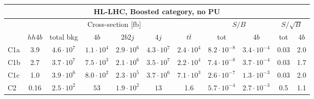 \begin{tabular}{|l|cc|cccc|cc|cc|}
  \hline
\multicolumn{11}{|c|}{HL-LHC, Boosted category, no PU}\\
\hline
&  \multicolumn{6}{c|}{Cross-section [fb]} &  \multicolumn{2}{c|}{$S/B$}  &  \multicolumn{2}{c|}{$S/\sqrt{B}$}  \\
   &  $hh4b$ &  total bkg  &   $4b$    &  $2b2j$   &   $4j$    &
$t\bar{t}$ &
tot & $4b$ & tot & $4b$ \\
  \hline
  \hline
 C1a     & 3.9  &   $4.6\cdot 10^7$   & $1.1\cdot 10^4$ & $2.9\cdot 10^6$ & $4.3\cdot 10^7$ & $2.4\cdot 10^4$   &   $8.2\cdot 10^{-8}$   & $3.4\cdot 10^{-4}$ &  0.03   & 2.0   \\
 C1b     & 2.7  &   $3.7\cdot 10^7$   & $7.5\cdot 10^3$ & $2.1\cdot 10^6$ & $3.5\cdot 10^7$ & $2.2\cdot 10^4$   &   $7.4\cdot 10^{-8}$   & $3.7\cdot 10^{-4}$ &  0.03   & 1.7   \\
 C1c     & 1.0  &   $3.9\cdot 10^6$   & $8.0\cdot 10^2$ & $2.3\cdot 10^5$ & $3.7\cdot 10^6$ & $7.1\cdot 10^3$   &   $2.6\cdot 10^{-7}$   & $1.3\cdot 10^{-3}$ &  0.03   & 2.0   \\
 C2      & 0.16  &   $2.5\cdot 10^2$  & $53$ & $1.9\cdot 10^2$ & $13$ & 1.6               &   $5.7\cdot 10^{-4}$   & $2.7\cdot 10^{-3}$ &   0.5                 & 1.1   \\
\hline
\end{tabular}
